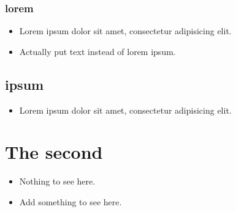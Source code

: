 \subsection{lorem}
\label{autosec:4}
    \begin{itemize}[noitemsep]
        \item Lorem ipsum dolor sit amet, consectetur adipisicing elit.
        \item {\color{red}Actually put text instead of lorem ipsum.}
    \end{itemize}
\section{ipsum}
\label{autosec:5}
    \begin{itemize}[noitemsep]
        \item Lorem ipsum dolor sit amet, consectetur adipisicing elit.
    \end{itemize}
\chapter{The second}
\label{autosec:6}
    \begin{itemize}[noitemsep]
        \item Nothing to see here.
        \item {\color{red}Add something to see here.}
    \end{itemize}


